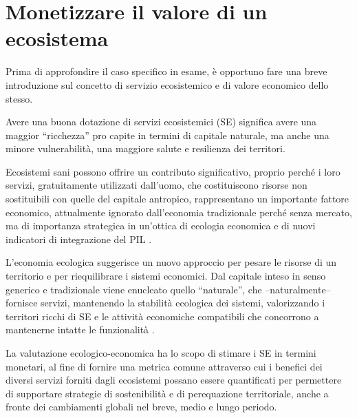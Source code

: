 \documentclass[14pt,a4paper]{article}
\begin{document}
	\section{Monetizzare il valore di un ecosistema}

	Prima di approfondire il caso specifico in esame, è opportuno fare una breve introduzione sul concetto di servizio ecosistemico e di valore economico dello stesso.
	
	Avere una buona dotazione di servizi ecosistemici (SE) significa avere una maggior ``ricchezza'' pro capite in termini di capitale naturale, ma anche una minore vulnerabilità, una maggiore salute e resilienza dei territori.
	
	Ecosistemi sani possono offrire un contributo significativo, proprio perché i loro servizi, gratuitamente utilizzati dall'uomo, che costituiscono risorse non sostituibili con quelle del capitale antropico, rappresentano un importante fattore economico, attualmente ignorato dall'economia tradizionale perché senza mercato, ma di importanza strategica in un'ottica di ecologia economica e di nuovi indicatori di integrazione del PIL \cite{oltre_il_PIL}.
	
	L'economia ecologica suggerisce un nuovo approccio per pesare le risorse di un territorio e per riequilibrare i sistemi economici. Dal capitale inteso in senso generico e tradizionale viene enucleato quello ``naturale'', che --naturalmente-- fornisce servizi, mantenendo la stabilità ecologica dei sistemi, valorizzando i territori ricchi di SE e le attività economiche compatibili che concorrono a mantenerne intatte le funzionalità \cite{SE_e_Sostenibilita}. 
	
	La valutazione ecologico-economica ha lo scopo di stimare i SE in termini monetari, al fine di fornire una metrica comune	attraverso cui i benefici dei diversi servizi forniti dagli ecosistemi possano essere quantificati \cite{MEA_EcosystemsAndHumanWellBeing:Synthesis} per permettere di supportare strategie di sostenibilità e di perequazione territoriale, anche a fronte dei cambiamenti globali nel breve, medio e lungo periodo. 
	
\end{document}
